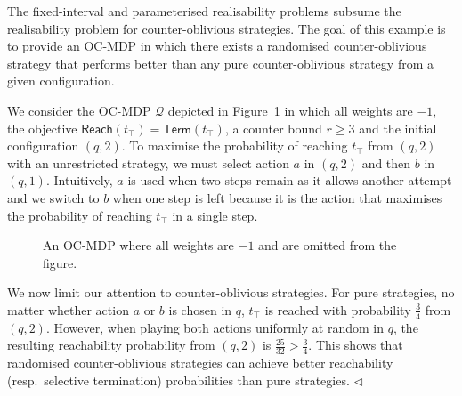 \documentclass[a4paper,UKenglish,cleveref,autoref,thm-restate,colorlinks]{lipics-v2021}
\newcommand{\ocmdp}{\mathcal{Q}}
\newcommand{\ocState}{q}
\newcommand{\ocStateC}{t}
\newcommand{\ocAction}{a}
\newcommand{\ocActionB}{b}
\newcommand{\counterUB}{r}
\newcommand{\reach}[1]{\mathsf{Reach}(#1)}
\newcommand{\termination}{\mathsf{Term}}
\newcommand{\selectiveTermination}[1]{\termination({#1})}
\begin{document}
\begin{example}\label{example:pure vs random}
  The fixed-interval and parameterised realisability problems subsume the realisability problem for counter-oblivious strategies.
  The goal of this example is to provide an OC-MDP in which there exists a randomised counter-oblivious strategy that performs better than any pure counter-oblivious strategy from a given configuration.

  We consider the OC-MDP $\ocmdp$ depicted in Figure~\ref{figure:example:pure vs random} in which all weights are $-1$, the objective $\reach{\ocStateC_\top}=\selectiveTermination{\ocStateC_\top}$, a counter bound $\counterUB\geq 3$ and the initial configuration $(\ocState, 2)$.
  To maximise the probability of reaching $\ocStateC_\top$ from $(\ocState, 2)$ with an unrestricted strategy, we must select action $\ocAction$ in $(\ocState, 2)$ and then $\ocActionB$ in $(\ocState, 1)$.
  Intuitively, $\ocAction$ is used when two steps remain as it allows another attempt and we switch to $\ocActionB$ when one step is left because it is the action that maximises the probability of reaching $\ocStateC_\top$ in a single step.

  
  \begin{figure}
    \centering
    \caption{An OC-MDP where all weights are $-1$ and are omitted from the figure.
    }\label{figure:example:pure vs random}
  \end{figure}

  
  We now limit our attention to counter-oblivious strategies.
  For pure strategies, no matter whether action $\ocAction$ or $\ocActionB$ is chosen in $\ocState$, $\ocStateC_\top$ is reached with probability $\frac{3}{4}$ from $(\ocState, 2)$.
  However, when playing both actions uniformly at random in $\ocState$, the resulting reachability probability from $(\ocState, 2)$ is $\frac{25}{32} > \frac{3}{4}$.
  This shows that randomised counter-oblivious strategies can achieve better reachability (resp.~selective termination) probabilities than pure strategies.
  \hfill$\lhd$
\end{example}
\end{document}

